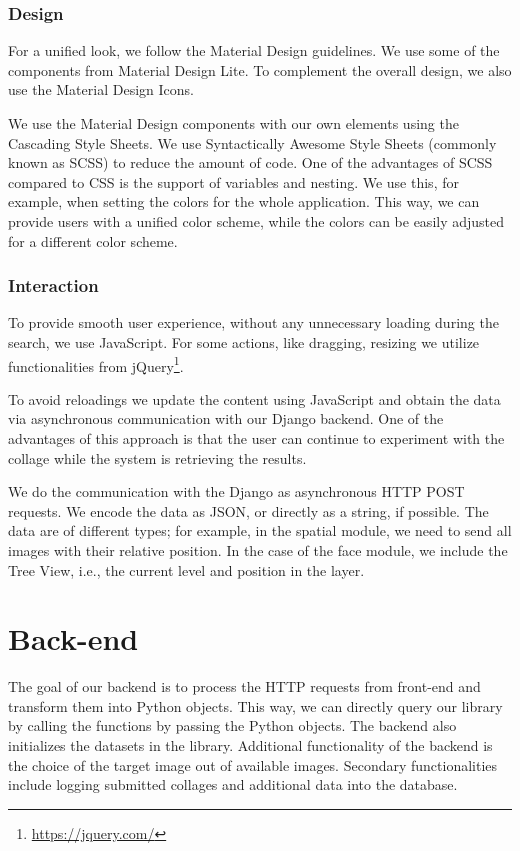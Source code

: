 \subsubsection*{Design}
For a unified look, we follow the Material Design guidelines. We use some of the components from Material Design Lite. To complement the overall design, we also use the Material Design Icons.

We use the Material Design components with our own elements using the Cascading Style Sheets. We use Syntactically Awesome Style Sheets (commonly known as SCSS) to reduce the amount of code. One of the advantages of SCSS compared to CSS is the support of variables and nesting. We use this, for example, when setting the colors for the whole application. This way, we can provide users with a unified color scheme, while the colors can be easily adjusted for a different color scheme.

\subsubsection*{Interaction}

To provide smooth user experience, without any unnecessary loading during the search, we use JavaScript. For some actions, like dragging, resizing we utilize functionalities from jQuery\footnote{\url{https://jquery.com/}}. 

To avoid reloadings we update the content using JavaScript and obtain the data via asynchronous communication with our Django backend. One of the advantages of this approach is that the user can continue to experiment with the collage while the system is retrieving the results.

We do the communication with the Django as asynchronous HTTP POST requests. We encode the data as JSON, or directly as a string, if possible. The data are of different types; for example, in the spatial module, we need to send all images with their relative position. In the case of the face module, we include the Tree View, i.e., the current level and position in the layer.

\section{Back-end}

The goal of our backend is to process the HTTP requests from front-end and transform them into Python objects. This way, we can directly query our library by calling the functions by passing the Python objects. The backend also initializes the datasets in the library. Additional functionality of the backend is the choice of the target image out of available images. Secondary functionalities include logging submitted collages and additional data into the database.

